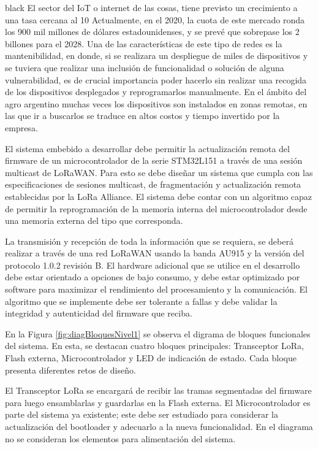 \documentclass[11pt]{charter}
\begin{document}
\begin{consigna}{black}
El sector del IoT o internet de las cosas, tiene previsto un crecimiento a una tasa cercana
al 10%
Actualmente, en el 2020, la cuota de este mercado ronda los 900 mil millones de dólares
estadounidenses, y se prevé que sobrepase los 2 billones para el 2028. Una de las
características de este tipo de redes es la mantenibilidad, en donde, si se realizara un
despliegue de miles de dispositivos y se tuviera que realizar una inclusión de
funcionalidad o solución de alguna vulnerabilidad, es de crucial importancia poder hacerlo
sin realizar una recogida de los dispositivos desplegados y reprogramarlos manualmente.
En el ámbito del agro argentino muchas veces los dispositivos son instalados en zonas
remotas, en las que ir a buscarlos se traduce en altos costos y tiempo invertido por la
empresa.

El sistema embebido a desarrollar debe permitir la actualización remota del firmware de
un microcontrolador de la serie STM32L151 a través de una sesión multicast de
LoRaWAN. Para esto se debe diseñar un sistema que cumpla con las especificaciones de
sesiones multicast, de fragmentación y actualización remota establecidas por la LoRa
Alliance\textregistered. El sistema debe contar con un algoritmo capaz de permitir la reprogramación de la memoria interna del microcontrolador desde una memoria externa del tipo que
corresponda.

La transmisión y recepción de toda la información que se requiera, se deberá realizar a
través de una red LoRaWAN usando la banda AU915 y la versión del protocolo 1.0.2
revisión B. El hardware adicional que se utilice en el desarrollo debe estar orientado a
opciones de bajo consumo, y debe estar optimizado por software para maximizar el
rendimiento del procesamiento y la comunicación. El algoritmo que se implemente debe
ser tolerante a fallas y debe validar la integridad y autenticidad del firmware que reciba.

En la Figura \ref{fig:diagBloquesNivel1} se observa el digrama de bloques funcionales del sistema. En esta, se destacan cuatro bloques principales: Transceptor LoRa, Flash externa, Microcontrolador y LED de indicación de estado. Cada bloque presenta diferentes retos de diseño.

El Transceptor LoRa se encargará de recibir las tramas segmentadas del firmware para luego ensamblarlas y guardarlas en la Flash externa. El Microcontrolador es parte del sistema ya existente; este debe ser estudiado para considerar la actualización del bootloader y adecuarlo a la nueva funcionalidad. En el diagrama no se consideran los elementos para alimentación del sistema.


\end{consigna}
\end{document}
